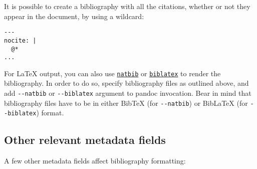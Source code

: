 \documentclass[
  a4paper,
]{article}
\begin{document}
It is possible to create a bibliography with all the citations, whether
or not they appear in the document, by using a wildcard:

\begin{verbatim}
---
nocite: |
  @*
...
\end{verbatim}

For LaTeX output, you can also use
\href{https://ctan.org/pkg/natbib}{\texttt{natbib}} or
\href{https://ctan.org/pkg/biblatex}{\texttt{biblatex}} to render the
bibliography. In order to do so, specify bibliography files as outlined
above, and add \texttt{-\/-natbib} or \texttt{-\/-biblatex} argument to
pandoc invocation. Bear in mind that bibliography files have to be in
either BibTeX (for \texttt{-\/-natbib}) or BibLaTeX (for
\texttt{-\/-biblatex}) format.

\hypertarget{other-relevant-metadata-fields}{%
\subsection{Other relevant metadata
fields}\label{other-relevant-metadata-fields}}

A few other metadata fields affect bibliography formatting:
\end{document}
